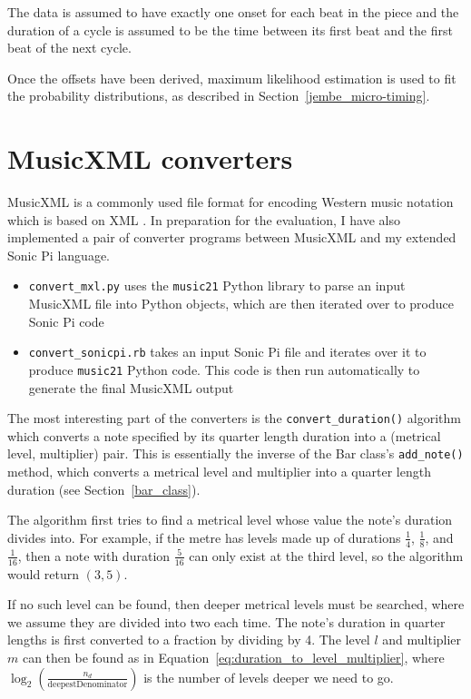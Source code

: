 \documentclass[12pt,twoside,openright]{report}
\begin{document}
The data is assumed to have exactly one onset for each beat in the piece and the
duration of a cycle is assumed to be the time between its first beat and the
first beat of the next cycle.

Once the offsets have been derived, maximum
likelihood estimation is used to fit the probability distributions, as described in
Section~\ref{jembe_micro-timing}.



\section{MusicXML converters} \label{musicxml_converters}

MusicXML is a commonly used file format for encoding Western music notation
which is based on XML \cite{good2001}. In preparation for the evaluation, I have also
implemented a pair of converter programs between MusicXML and my extended Sonic
Pi language.

\begin{itemize}
	\item \verb'convert_mxl.py' uses the \verb'music21' Python library to parse an input MusicXML file into Python objects, which are then iterated over to produce Sonic Pi code
	\item \verb'convert_sonicpi.rb' takes an input Sonic Pi file and iterates over it to produce \verb'music21' Python code. This code is then run automatically to generate the final MusicXML output
\end{itemize}

The most interesting part of the converters is the \verb'convert_duration()' algorithm
which converts a note specified by its quarter length duration into a (metrical
level, multiplier) pair. This is essentially the inverse of the Bar class's
\verb'add_note()' method, which converts a metrical level and multiplier into a quarter length duration (see Section~\ref{bar_class}).

The algorithm first tries to find a metrical
level whose value the note's duration divides into. For example, if the metre
has levels made up of durations $\frac{1}{4}$, $\frac{1}{8}$, and $\frac{1}{16}$, then a note with duration $\frac{5}{16}$
can only exist at the third level, so the algorithm would return $(3,5)$.

If no
such level can be found, then deeper metrical levels must be searched, where we
assume they are divided into two each time. The note's duration in quarter
lengths is first converted to a fraction by dividing by 4. The level $l$ and
multiplier $m$ can then be found as in Equation~\ref{eq:duration_to_level_multiplier}, where $\log_2\left(\frac{n_d}{\mathrm{deepestDenominator}}\right)$ is the number of levels deeper we need to
go.
\end{document}
